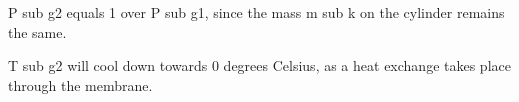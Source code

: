 P sub g2 equals 1 over P sub g1, since the mass m sub k on the cylinder remains the same.

T sub g2 will cool down towards 0 degrees Celsius, as a heat exchange takes place through the membrane.